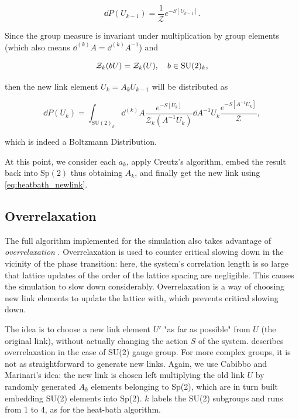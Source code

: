 \documentclass[reqno,12pt]{article}
\numberwithin{equation}{section}
\newcommand{\Z}{\mathcal{Z}}
\newcommand{\SU}{\mathrm{SU}}
\newcommand{\Sp}{\mathrm{Sp}}
\begin{document}
\begin{equation}
	\dd{P(U_{k-1})} = \frac{1}{\Z} e^{-S[U_{k-1}]}.
\end{equation}

Since the group measure is invariant under multiplication by group elements (which also means 
$\dd^{(k)}{A} = \dd^{(k)}{A^{-1}}$) and

\begin{equation}
	\Z_k(b U) = \Z_k(U) \qc b \in \SU(2)_k,
\end{equation}

then the new link element $U_k = A_k U_{k-1}$ will be distributed as

\begin{equation}
	\dd{P(U_k)} = \int_{\SU(2)_k} \dd^{(k)}{A} \frac{e^{-S[U_k]}}{\Z_k(A^{-1}U_k)} \dd{A^{-1}U_k} \frac{e^{-S[A^{-1}U_k]}}{\Z},
\end{equation}

which is indeed a Boltzmann Distribution. 

At this point, we consider each $a_k$, apply Creutz's algorithm, embed the result back into $\Sp(2)$ thus obtaining
$A_k$, and finally get the new link using \eqref{eq:heatbath_newlink}.

\subsection{Overrelaxation} \label{overrelaxation}

The full algorithm implemented for the simulation also takes advantage of \textit{overrelaxation} \cite{montvay}.
Overrelaxation is used to counter critical slowing down in the vicinity of the phase transition: here,
the system's correlation length is so large that lattice updates of the order of the lattice spacing are
negligible. This causes the simulation to slow down considerably. 
Overrelaxation is a way of choosing new link elements to update the lattice with, which prevents critical
slowing down. 

The idea is to choose a new link element $U'$ "as far as possible" from $U$ (the original link), without actually changing the
action $S$ of the system. \cite{montvay} describes overrelaxation in the case of SU(2) gauge group. For more
complex groups, it is not as straightforward to generate new links. Again, we use Cabibbo and Marinari's idea:
the new link is chosen left multiplying the old link $U$ by randomly generated $A_k$ elements belonging
to Sp(2), which are in turn built embedding SU(2) elements into Sp(2). $k$ labels the SU(2) subgroups and runs
from 1 to 4, as for the heat-bath algorithm. 
\end{document}
